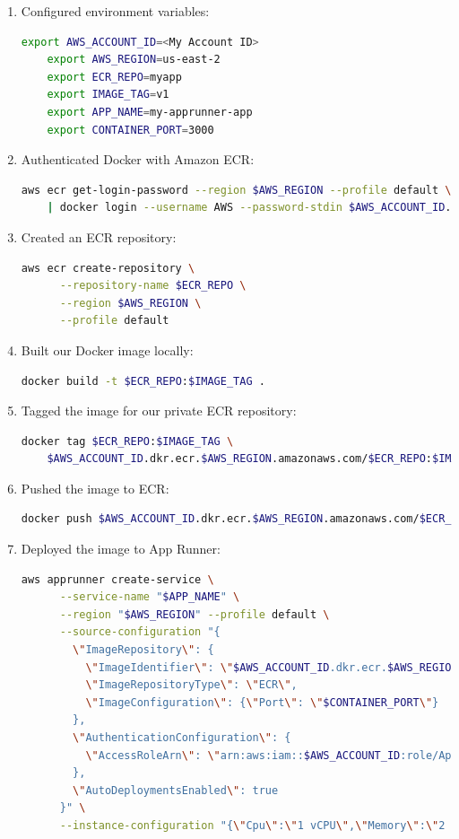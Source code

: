 \begin{enumerate}

    \item Configured environment variables:
    \begin{lstlisting}[language=bash]
    export AWS_ACCOUNT_ID=<My Account ID>
    export AWS_REGION=us-east-2
    export ECR_REPO=myapp
    export IMAGE_TAG=v1
    export APP_NAME=my-apprunner-app
    export CONTAINER_PORT=3000
    \end{lstlisting}

    \item Authenticated Docker with Amazon ECR:
    \begin{lstlisting}[language=bash]
    aws ecr get-login-password --region $AWS_REGION --profile default \
    | docker login --username AWS --password-stdin $AWS_ACCOUNT_ID.dkr.ecr.$AWS_REGION.amazonaws.com
    \end{lstlisting}

    \item Created an ECR repository:
    \begin{lstlisting}[language=bash]
    aws ecr create-repository \
      --repository-name $ECR_REPO \
      --region $AWS_REGION \
      --profile default
    \end{lstlisting}

    \item Built our Docker image locally:
    \begin{lstlisting}[language=bash]
    docker build -t $ECR_REPO:$IMAGE_TAG .
    \end{lstlisting}

    \item Tagged the image for our private ECR repository:
    \begin{lstlisting}[language=bash]
    docker tag $ECR_REPO:$IMAGE_TAG \
    $AWS_ACCOUNT_ID.dkr.ecr.$AWS_REGION.amazonaws.com/$ECR_REPO:$IMAGE_TAG
    \end{lstlisting}

    \item Pushed the image to ECR:
    \begin{lstlisting}[language=bash]
    docker push $AWS_ACCOUNT_ID.dkr.ecr.$AWS_REGION.amazonaws.com/$ECR_REPO:$IMAGE_TAG
    \end{lstlisting}

    \item Deployed the image to App Runner:
    \begin{lstlisting}[language=bash]
    aws apprunner create-service \
      --service-name "$APP_NAME" \
      --region "$AWS_REGION" --profile default \
      --source-configuration "{
        \"ImageRepository\": {
          \"ImageIdentifier\": \"$AWS_ACCOUNT_ID.dkr.ecr.$AWS_REGION.amazonaws.com/$ECR_REPO:$IMAGE_TAG\",
          \"ImageRepositoryType\": \"ECR\",
          \"ImageConfiguration\": {\"Port\": \"$CONTAINER_PORT\"}
        },
        \"AuthenticationConfiguration\": {
          \"AccessRoleArn\": \"arn:aws:iam::$AWS_ACCOUNT_ID:role/AppRunnerECRAccessRole\"
        },
        \"AutoDeploymentsEnabled\": true
      }" \
      --instance-configuration "{\"Cpu\":\"1 vCPU\",\"Memory\":\"2 GB\"}"
    \end{lstlisting}


\end{enumerate}
